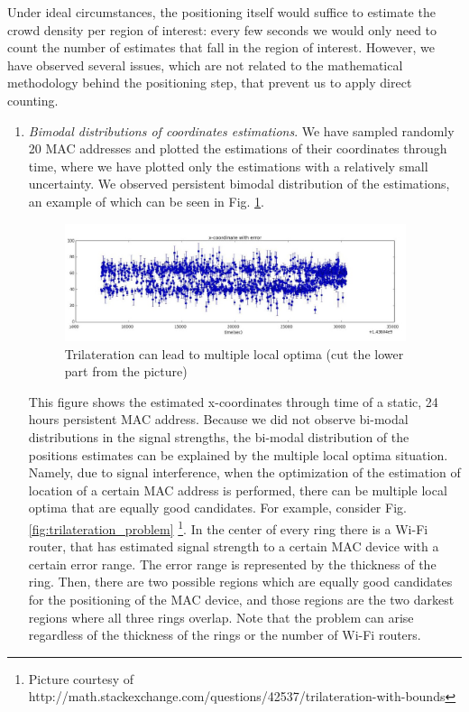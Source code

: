 \documentclass[10pt,a4paper]{article}
\begin{document}
Under ideal circumstances, the positioning itself would suffice to estimate the crowd density per region of interest:  every few seconds we would only need to count the number of estimates that fall in the region of interest. However, we have observed several issues, which are not related to the mathematical methodology behind the positioning step, that prevent us to apply direct counting. 
\begin{enumerate}
	\item
	{\it Bimodal distributions of coordinates estimations}. We have sampled randomly 20 MAC addresses and plotted the estimations of their coordinates through time, where we have plotted only the estimations with a relatively small uncertainty. We observed persistent bimodal distribution of the estimations, an example of which can be seen in Fig. \ref{fig:bimodal}. 
		\begin{figure}[h!]
			\centering
			\includegraphics[width=100mm]{bimodal.jpg}
			\caption{Trilateration can lead to multiple local optima (cut the lower part from the picture)}
			\label{fig:bimodal}
		\end{figure} 
	This figure shows the estimated x-coordinates through time of a static, 24 hours persistent MAC address. Because we did not observe  bi-modal distributions in the signal strengths, the bi-modal distribution of the positions estimates can be explained by the multiple local optima situation. Namely, due to signal interference, when the optimization of the estimation of location of a certain MAC address is performed, there can be multiple local optima that are equally good candidates. For example, consider Fig. \ref{fig:trilateration_problem} \footnote{Picture courtesy of http://math.stackexchange.com/questions/42537/trilateration-with-bounds}. In the center of every ring there is a Wi-Fi router, that has estimated signal strength to a certain MAC device with a certain error range. The error range is represented by the thickness of the ring. Then, there are two possible regions which are equally good candidates for the positioning of the MAC device, and those regions are the two darkest regions where all three rings overlap. Note that the problem can arise regardless of the thickness of the rings or the number of Wi-Fi routers. 	

\end{enumerate}
\end{document}
